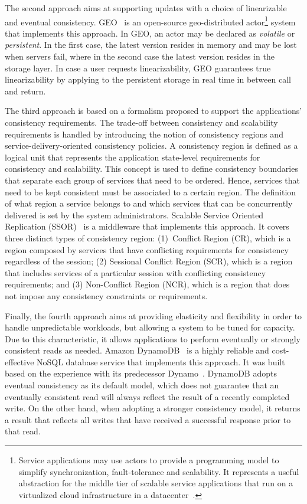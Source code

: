 The second approach aims at supporting updates with a choice of linearizable and eventual consistency. GEO~\cite{BernsteinBBCFKK17} is an open-source geo-distributed actor\footnote{Service applications may use actors to provide a programming model to simplify synchronization, fault-tolerance and scalability. It represents a useful abstraction for the middle tier of scalable service applications that run on a virtualized cloud infrastructure in a datacenter~\cite{BernsteinBBCFKK17}.} system that implements this approach. In GEO, an actor may be declared as \textit{volatile} or \textit{persistent}. In the first case, the latest version resides in memory and may be lost when servers fail, where in the second case the latest version resides in the storage layer. In case a user requests linearizability, GEO guarantees true linearizability by applying to the persistent storage in real time in between call and return.

The third approach is based on a formalism proposed to support the applications’ consistency requirements. The trade-off between consistency and scalability requirements is handled by introducing the notion of consistency regions and service-delivery-oriented consistency policies. A consistency region is defined as a logical unit that represents the application state-level requirements for consistency and scalability. This concept is used to define consistency boundaries that separate each group of services that need to be ordered. Hence, services that need to be kept consistent must be associated to a certain region. The definition of what region a service belongs to and which services that can be concurrently delivered is set by the system administrators. 
Scalable Service Oriented Replication (SSOR)~\cite{Chen:2014} is a middleware that implements this approach. It covers three distinct types of consistency region: (1)~Conflict Region (CR), which is a region composed by services that have conflicting requirements for consistency regardless of the session; (2) Sessional Conflict Region (SCR), which is a region that includes services of a particular session with conflicting consistency requirements; and (3) Non-Con\-flict Region (NCR), which is a region that does not impose any consistency constraints or requirements.

Finally, the fourth approach aims at providing elasticity and flexibility in order to handle unpredictable workloads, but allowing a system to be tuned for capacity. Due to this characteristic, it allows applications to perform eventually or strongly consistent reads as needed. Amazon DynamoDB~\cite{sivasubramanian2012amazon} is a highly reliable and cost-effective NoSQL database service that implements this  approach. It was built based on the experience with its predecessor Dynamo~\cite{decandia2007dynamo}. DynamoDB adopts eventual consistency as its default model, which does not guarantee that an eventually consistent read will always reflect the result of a recently completed write. On the other hand, when adopting a stronger consistency model, it returns a result that reflects all writes that have received a successful response prior to that read.

